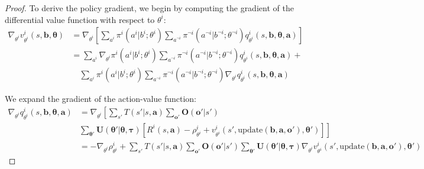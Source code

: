 \documentclass[a4paper,12pt]{report}
\begin{document}
\begin{proof}
    To derive the policy gradient, we begin by computing the gradient of the differential
    value function with respect to $\theta^{i}$:
    \begin{align}
        \nabla_{\theta^i}v^{i}_{\theta^i}(s, \boldsymbol{b}, \boldsymbol{\theta}) & = \nabla_{\theta^i}\left[ \sum_{a^i}\pi^{i}(a^{i}|b^{i}; \theta^{i}) \sum_{a^{\neg i}}\pi^{\neg i}(a^{\neg i}|b^{\neg i}; \theta^{\neg i}) q^{i}_{\theta^i}(s, \boldsymbol{b}, \boldsymbol{\theta}, \boldsymbol{a}) \right] \\
                                                                                  & = \sum_{a^i}\nabla_{\theta^i}\pi^{i}(a^{i}|b^{i}; \theta^{i}) \sum_{a^{\neg i}}\pi^{\neg i}(a^{\neg i}|b^{\neg i}; \theta^{\neg i}) q^{i}_{\theta^i}(s, \boldsymbol{b}, \boldsymbol{\theta}, \boldsymbol{a}) +              \\
                                                                                  & \quad \sum_{a^i}\pi^{i}(a^{i}|b^{i}; \theta^{i}) \sum_{a^{\neg i}}\pi^{\neg i}(a^{\neg i}|b^{\neg i}; \theta^{\neg i}) \nabla_{\theta^i}q^{i}_{\theta^i}(s, \boldsymbol{b}, \boldsymbol{\theta}, \boldsymbol{a})
    \end{align}

    We expand the gradient of the action-value function:
    \begin{align}
        \nabla_{\theta^i}q^{i}_{\theta^i}(s, \boldsymbol{b}, \boldsymbol{\theta}, \boldsymbol{a}) & = \nabla_{\theta^i}\left[ \sum_{s'}T(s'|s, \boldsymbol{a}) \sum_{\boldsymbol{o}'}\boldsymbol{O}(\boldsymbol{o}'|s') \right.                                                                                                                                                                                                                                           \\
                                                                                                  & \left. \sum_{\boldsymbol{\theta}'}\boldsymbol{U}(\boldsymbol{\theta}'|\boldsymbol{\theta}, \boldsymbol{\tau}) \left[ R^{i}(s, \boldsymbol{a}) - \rho^{i}_{\theta^i}+ v^{i}_{\theta^i}(s', \text{update}(\boldsymbol{b}, \boldsymbol{a}, \boldsymbol{o}'), \boldsymbol{\theta}') \right] \right]                                                                       \\
                                                                                                  & = -\nabla_{\theta^i}\rho^{i}_{\theta^i}+ \sum_{s'}T(s'|s, \boldsymbol{a}) \sum_{\boldsymbol{o}'}\boldsymbol{O}(\boldsymbol{o}'|s') \sum_{\boldsymbol{\theta}'}\boldsymbol{U}(\boldsymbol{\theta}'|\boldsymbol{\theta}, \boldsymbol{\tau}) \nabla_{\theta^i}v^{i}_{\theta^i}(s', \text{update}(\boldsymbol{b}, \boldsymbol{a}, \boldsymbol{o}'), \boldsymbol{\theta}')
    \end{align}


\end{proof}
\end{document}

